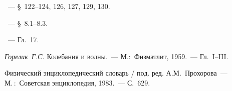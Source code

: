 

\begin{lab:literature}
	\item \SivuhinIII~--- \S~122--124, 126, 127, 129, 130.
	\item \KingLokOlh~--- \S~8.1--8.3.
	\item \Kirichenko~--- Гл.~17.
	\item \textit{Горелик~Г.С.} Колебания и волны.~--- М.:~Физматлит,
1959.~--- Гл.~I--III.
	\item Физический энциклопедический словарь / под. ред. А.М.~Прохорова~--- 
    М.\,:~Советская энциклопедия, 1983.~--- С.~629.
\end{lab:literature}
